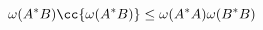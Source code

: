 \begin{equation}
    \label{eq:CSU}
    \omega(A^*B)\cc{\omega(A^*B)} \le \omega(A^*A) \omega(B^*B)
\end{equation}


